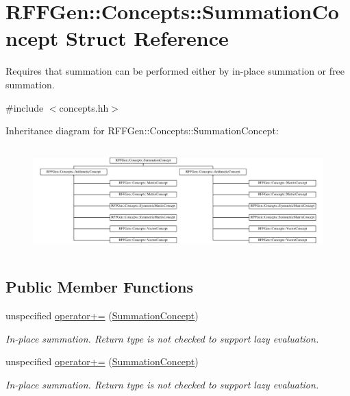 \hypertarget{structRFFGen_1_1Concepts_1_1SummationConcept}{\section{R\-F\-F\-Gen\-:\-:Concepts\-:\-:Summation\-Concept Struct Reference}
\label{structRFFGen_1_1Concepts_1_1SummationConcept}
}


Requires that summation can be performed either by in-\/place summation or free summation.  




{\ttfamily \#include $<$concepts.\-hh$>$}

Inheritance diagram for R\-F\-F\-Gen\-:\-:Concepts\-:\-:Summation\-Concept\-:\begin{figure}[H]
\begin{center}
\leavevmode
\includegraphics[height=4.117647cm]{structRFFGen_1_1Concepts_1_1SummationConcept}
\end{center}
\end{figure}
\subsection*{Public Member Functions}
\begin{DoxyCompactItemize}
\item 
\hypertarget{structRFFGen_1_1Concepts_1_1SummationConcept_adc0349034311b99726f0c845d8c06a33}{unspecified \hyperlink{structRFFGen_1_1Concepts_1_1SummationConcept_adc0349034311b99726f0c845d8c06a33}{operator+=} (\hyperlink{structRFFGen_1_1Concepts_1_1SummationConcept}{Summation\-Concept})}\label{structRFFGen_1_1Concepts_1_1SummationConcept_adc0349034311b99726f0c845d8c06a33}

\begin{DoxyCompactList}\small\item\em In-\/place summation. Return type is not checked to support lazy evaluation. \end{DoxyCompactList}\item 
\hypertarget{structRFFGen_1_1Concepts_1_1SummationConcept_adc0349034311b99726f0c845d8c06a33}{unspecified \hyperlink{structRFFGen_1_1Concepts_1_1SummationConcept_adc0349034311b99726f0c845d8c06a33}{operator+=} (\hyperlink{structRFFGen_1_1Concepts_1_1SummationConcept}{Summation\-Concept})}\label{structRFFGen_1_1Concepts_1_1SummationConcept_adc0349034311b99726f0c845d8c06a33}

\begin{DoxyCompactList}\small\item\em In-\/place summation. Return type is not checked to support lazy evaluation. \end{DoxyCompactList}\end{DoxyCompactItemize}


